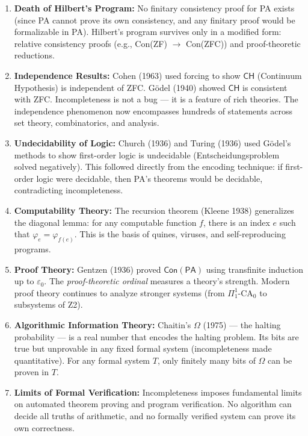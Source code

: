 \begin{enumerate}
\item \textbf{Death of Hilbert's Program:} No finitary consistency proof for PA exists (since PA cannot prove its own consistency, and any finitary proof would be formalizable in PA). Hilbert's program survives only in a modified form: relative consistency proofs (e.g., Con(ZF) $\to$ Con(ZFC)) and proof-theoretic reductions.

\item \textbf{Independence Results:} Cohen (1963) used forcing to show $\mathsf{CH}$ (Continuum Hypothesis) is independent of ZFC. Gödel (1940) showed $\mathsf{CH}$ is consistent with ZFC. Incompleteness is not a bug --- it is a feature of rich theories. The independence phenomenon now encompasses hundreds of statements across set theory, combinatorics, and analysis.

\item \textbf{Undecidability of Logic:} Church (1936) and Turing (1936) used Gödel's methods to show first-order logic is undecidable (Entscheidungsproblem solved negatively). This followed directly from the encoding technique: if first-order logic were decidable, then PA's theorems would be decidable, contradicting incompleteness.

\item \textbf{Computability Theory:} The recursion theorem (Kleene 1938) generalizes the diagonal lemma: for any computable function $f$, there is an index $e$ such that $\varphi_e = \varphi_{f(e)}$. This is the basis of quines, viruses, and self-reproducing programs.

\item \textbf{Proof Theory:} Gentzen (1936) proved $\mathsf{Con}(\mathsf{PA})$ using transfinite induction up to $\varepsilon_0$. The \emph{proof-theoretic ordinal} measures a theory's strength. Modern proof theory continues to analyze stronger systems (from $\Pi^1_1$-CA$_0$ to subsystems of Z2).

\item \textbf{Algorithmic Information Theory:} Chaitin's $\Omega$ (1975) --- the halting probability --- is a real number that encodes the halting problem. Its bits are true but unprovable in any fixed formal system (incompleteness made quantitative). For any formal system $T$, only finitely many bits of $\Omega$ can be proven in $T$.

\item \textbf{Limits of Formal Verification:} Incompleteness imposes fundamental limits on automated theorem proving and program verification. No algorithm can decide all truths of arithmetic, and no formally verified system can prove its own correctness.
\end{enumerate}

